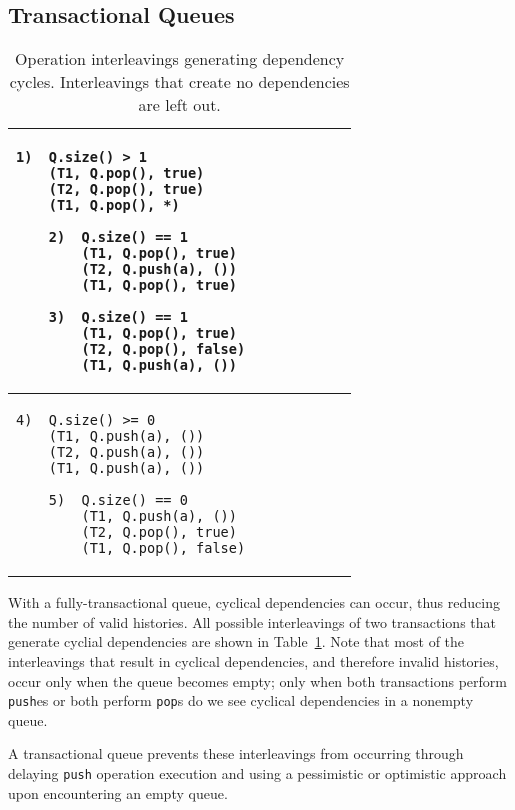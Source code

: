 \subsection{Transactional Queues}

\begin{table}
    \centering
    \begin{tabular}{|l|}
        \hline
\begin{lstlisting}
1)  Q.size() > 1
    (T1, Q.pop(), true)        
    (T2, Q.pop(), true)        
    (T1, Q.pop(), *)
\end{lstlisting}
\begin{lstlisting}
    2)  Q.size() == 1 
        (T1, Q.pop(), true)     
        (T2, Q.push(a), ())             
        (T1, Q.pop(), true)
    \end{lstlisting}
    \begin{lstlisting}
    3)  Q.size() == 1 
        (T1, Q.pop(), true)     
        (T2, Q.pop(), false)     
        (T1, Q.push(a), ())             
\end{lstlisting}
    \\
    \hline
\begin{lstlisting}
4)  Q.size() >= 0        
    (T1, Q.push(a), ())
    (T2, Q.push(a), ())             
    (T1, Q.push(a), ())             
\end{lstlisting}
    \begin{lstlisting}
    5)  Q.size() == 0 
        (T1, Q.push(a), ())             
        (T2, Q.pop(), true)
        (T1, Q.pop(), false)
\end{lstlisting}
\\
        \hline
\end{tabular}
    \caption{Operation interleavings generating dependency cycles. Interleavings that create no dependencies are left out.}
    \label{tab:interleavings}
\end{table}

With a fully-transactional queue, cyclical dependencies can occur, thus reducing the number of valid histories. All possible interleavings of two transactions that generate cyclial dependencies are shown in Table~\ref{tab:interleavings}. Note that most of the interleavings that result in cyclical dependencies, and therefore invalid histories, occur only when the queue becomes empty; only when both transactions perform \texttt{push}es or both perform \texttt{pop}s do we see cyclical dependencies in a nonempty queue. 

A transactional queue prevents these interleavings from occurring through delaying \texttt{push} operation execution and using a pessimistic or optimistic approach upon encountering an empty queue.

